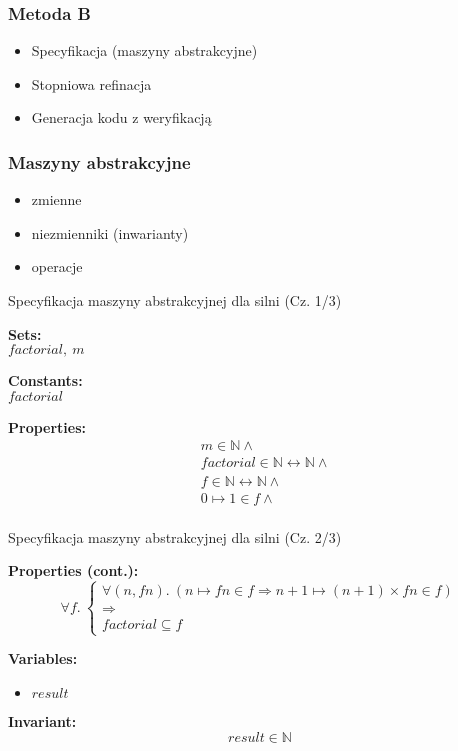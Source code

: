 \documentclass{beamer}
\begin{document}
\begin{frame}
\frametitle{Metoda B}
\begin{itemize}
\item Specyfikacja (maszyny abstrakcyjne)
\item Stopniowa refinacja
\item Generacja kodu z weryfikacją
\end{itemize}
\end{frame}

\begin{frame}
\frametitle{Maszyny abstrakcyjne}

\begin{itemize}
    \item zmienne
    \item niezmienniki (inwarianty)
    \item operacje
\end{itemize}
\end{frame}

\begin{frame}{Specyfikacja maszyny abstrakcyjnej dla silni (Cz. 1/3)}
\begin{tcolorbox}[colback=white, colframe=blue!30!black, title=Machine FACTORIAL\_MAC]
\textbf{Sets:} \\
$\textit{factorial},\ m$

\textbf{Constants:} \\
$\textit{factorial}$

\textbf{Properties:}
\[
\begin{aligned}
& m \in \mathbb{N} \land \\
& \textit{factorial} \in \mathbb{N} \leftrightarrow \mathbb{N} \land \\
& f \in \mathbb{N} \leftrightarrow \mathbb{N} \land \\
& 0 \mapsto 1 \in f \land \\
\end{aligned}
\]
\end{tcolorbox}
\end{frame}

\begin{frame}{Specyfikacja maszyny abstrakcyjnej dla silni (Cz. 2/3)}
\begin{tcolorbox}[colback=white, colframe=blue!30!black, title=Machine FACTORIAL\_MAC]
\textbf{Properties (cont.):}
\[
\forall f.\ \begin{cases}
\forall (n, fn).\ (n \mapsto fn \in f \Rightarrow n+1 \mapsto (n+1) \times fn \in f) \\
\Rightarrow \\
\textit{factorial} \subseteq f
\end{cases}
\]

\textbf{Variables:}
\begin{itemize}
    \item $\textit{result}$
\end{itemize}

\textbf{Invariant:}
\[
\textit{result} \in \mathbb{N}
\]
\end{tcolorbox}
\end{frame}
\end{document}
